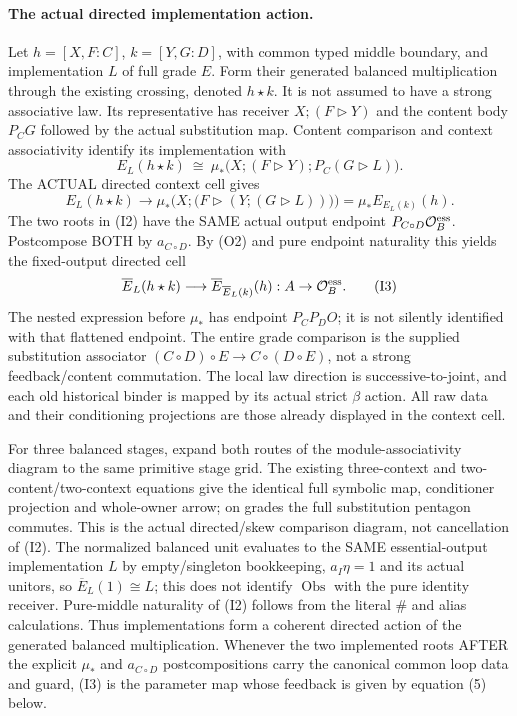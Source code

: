 \documentclass[11pt]{article}
\begin{document}
\paragraph{The actual directed implementation action.}
Let $h=[X,F:C]$, $k=[Y,G:D]$, with common typed middle boundary, and implementation $L$ of full grade $E$. Form their generated balanced multiplication through the existing crossing, denoted $h\star k$. It is not assumed to have a strong associative law. Its representative has receiver $X;(F\triangleright Y)$ and the content body $P_CG$ followed by the actual substitution map. Content comparison and context associativity identify its implementation with
\[
 E_L(h\star k)\ \cong\
 \mu_*\bigl(X;(F\triangleright Y);P_C(G\triangleright L)\bigr).
\]
The ACTUAL directed context cell gives
\[
 E_L(h\star k)\longrightarrow
 \mu_*\bigl(X;\bigl(F\triangleright(Y;(G\triangleright L))\bigr)\bigr)
       = \mu_* E_{E_L(k)}(h).                                  \tag{I2}
\]
The two roots in (I2) have the SAME actual output endpoint $P_{C\circ D}\mathcal O_B^{\rm ess}$. Postcompose BOTH by $a_{C\circ D}$. By (O2) and pure endpoint naturality this yields the fixed-output directed cell
\[
 \overline E_L(h\star k)\longrightarrow
 \overline E_{\overline E_L(k)}(h):A\to\mathcal O_B^{\rm ess}. \tag{I3}
\]
 The nested expression before $\mu_*$ has endpoint $P_CP_DO$; it is not silently identified with that flattened endpoint. The entire grade comparison is the supplied substitution associator
$(C\circ D)\circ E\to C\circ(D\circ E)$, not a strong feedback/content commutation. The local law direction is successive-to-joint, and each old historical binder is mapped by its actual strict $\beta$ action. All raw data and their conditioning projections are those already displayed in the context cell.

For three balanced stages, expand both routes of the module-associativity diagram to the same primitive stage grid. The existing three-context and two-content/two-context equations give the identical full symbolic map, conditioner projection and whole-owner arrow; on grades the full substitution pentagon commutes. This is the actual directed/skew comparison diagram, not cancellation of (I2). The normalized balanced unit evaluates to the SAME essential-output implementation $L$ by empty/singleton bookkeeping, $a_I\eta=1$ and its actual unitors, so $\overline E_L(1)\cong L$; this does not identify $\operatorname{Obs}$ with the pure identity receiver. Pure-middle naturality of (I2) follows from the literal $\#$ and alias calculations. Thus implementations form a coherent directed action of the generated balanced multiplication. Whenever the two implemented roots AFTER the explicit $\mu_*$ and $a_{C\circ D}$ postcompositions carry the canonical common loop data and guard, (I3) is the parameter map whose feedback is given by equation (5) below.
\end{document}
